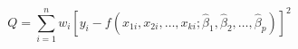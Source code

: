 

\[
Q=\sum_{i=1}^{n}w_i[y_i-f(x_{1i},x_{2i},\ldots,x_{ki};\hat{\beta}_1,\hat{\beta}_2,\ldots,\hat{\beta}_p)]^2

\]



